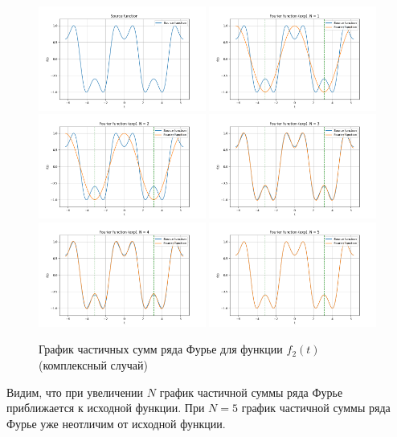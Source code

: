 \begin{figure}[ht!]
    \centering
    \includegraphics[width=0.49\textwidth]{media/plots/func_2_exp.png}
    \includegraphics[width=0.49\textwidth]{media/plots/func_2_exp_N_1.png}
    \includegraphics[width=0.49\textwidth]{media/plots/func_2_exp_N_2.png}
    \includegraphics[width=0.49\textwidth]{media/plots/func_2_exp_N_3.png}
    \includegraphics[width=0.49\textwidth]{media/plots/func_2_exp_N_4.png}
    \includegraphics[width=0.49\textwidth]{media/plots/func_2_exp_N_5.png}
    \caption{График частичных сумм ряда Фурье для функции $f_2(t)$ (комплексный случай)}
    \label{fig:func_2_plot_exp}
\end{figure}

Видим, что при увеличении $N$ график частичной суммы ряда Фурье приближается к исходной функции. При $N = 5$ график частичной суммы ряда Фурье уже неотличим от исходной функции.
